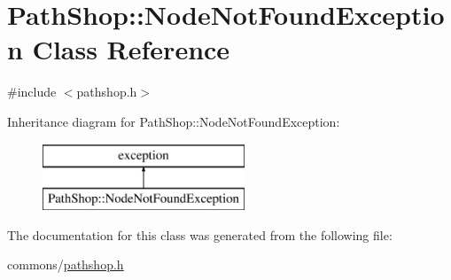 \hypertarget{class_path_shop_1_1_node_not_found_exception}{}\section{Path\+Shop\+::Node\+Not\+Found\+Exception Class Reference}
\label{class_path_shop_1_1_node_not_found_exception}


{\ttfamily \#include $<$pathshop.\+h$>$}

Inheritance diagram for Path\+Shop\+::Node\+Not\+Found\+Exception\+:\begin{figure}[H]
\begin{center}
\leavevmode
\includegraphics[height=2.000000cm]{d7/dfa/class_path_shop_1_1_node_not_found_exception}
\end{center}
\end{figure}


The documentation for this class was generated from the following file\+:\begin{DoxyCompactItemize}
\item 
commons/\mbox{\hyperlink{pathshop_8h}{pathshop.\+h}}\end{DoxyCompactItemize}
